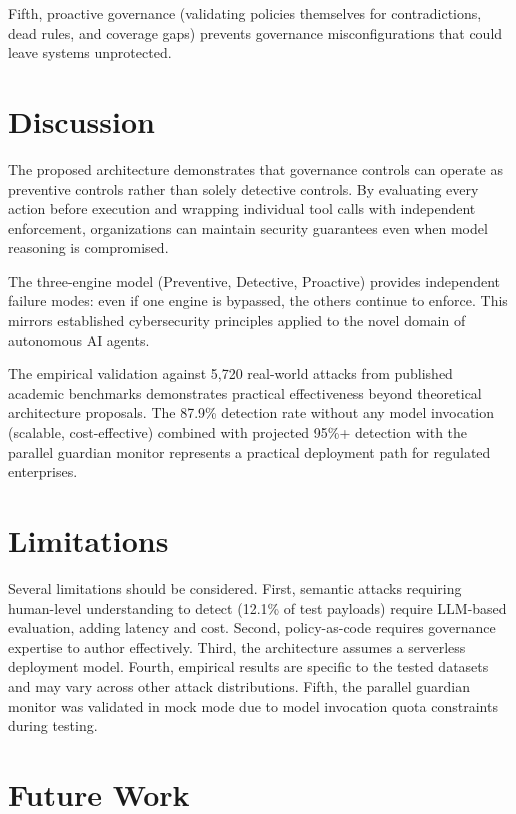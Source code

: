 \documentclass[conference]{IEEEtran}
\begin{document}
Fifth, proactive governance (validating policies themselves for contradictions, dead rules, and coverage gaps) prevents governance misconfigurations that could leave systems unprotected.

\section{Discussion}

The proposed architecture demonstrates that governance controls can operate as preventive controls rather than solely detective controls. By evaluating every action before execution and wrapping individual tool calls with independent enforcement, organizations can maintain security guarantees even when model reasoning is compromised.

The three-engine model (Preventive, Detective, Proactive) provides independent failure modes: even if one engine is bypassed, the others continue to enforce. This mirrors established cybersecurity principles applied to the novel domain of autonomous AI agents.

The empirical validation against 5,720 real-world attacks from published academic benchmarks demonstrates practical effectiveness beyond theoretical architecture proposals. The 87.9\% detection rate without any model invocation (scalable, cost-effective) combined with projected 95\%+ detection with the parallel guardian monitor represents a practical deployment path for regulated enterprises.

\section{Limitations}

Several limitations should be considered. First, semantic attacks requiring human-level understanding to detect (12.1\% of test payloads) require LLM-based evaluation, adding latency and cost. Second, policy-as-code requires governance expertise to author effectively. Third, the architecture assumes a serverless deployment model. Fourth, empirical results are specific to the tested datasets and may vary across other attack distributions. Fifth, the parallel guardian monitor was validated in mock mode due to model invocation quota constraints during testing.

\section{Future Work}
\end{document}
